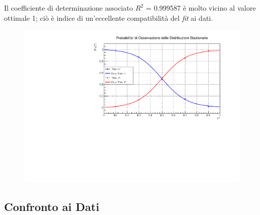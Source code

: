 \documentclass[letterpaper,10pt]{article}
\begin{document}
Il coefficiente di determinazione associato $R^2$ = 0.999587 è molto vicino al valore ottimale 1; ciò è indice di un'eccellente compatibilità del \textit{fit} ai dati.
\begin{figure}[h]
\centering
\includegraphics[width=0.9\linewidth]{fit_grav.pdf}
\label{Fig:19}
\end{figure}

\subsection{Confronto ai Dati}
\label{Sec:4.5}
\end{document}
